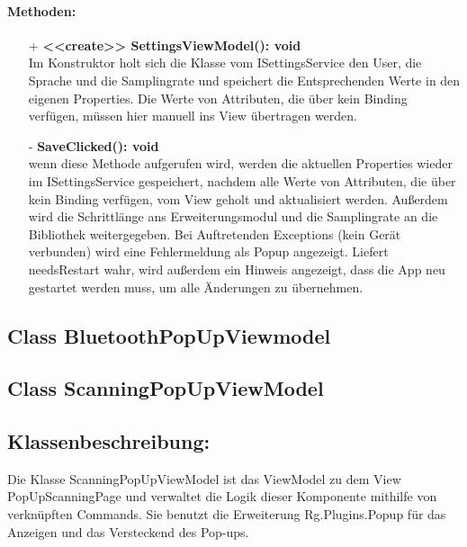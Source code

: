\documentclass[a4paper,12pt]{article}
\begin{document}
\paragraph{Methoden:}
\begin{itemize}
    \item[+] \textbf{<<create>> SettingsViewModel(): void}\\ Im Konstruktor holt sich die Klasse vom ISettingsService den User, die Sprache und die Samplingrate und speichert die Entsprechenden Werte in den eigenen Properties. Die Werte von Attributen, die über kein Binding verfügen, müssen hier manuell ins View übertragen werden.
    \item[-] \textbf{SaveClicked(): void}\\ wenn diese Methode aufgerufen wird, werden die aktuellen Properties wieder im ISettingsService gespeichert, nachdem alle Werte von Attributen, die über kein Binding verfügen, vom View geholt und aktualisiert werden. Außerdem wird die Schrittlänge ans Erweiterungsmodul und die Samplingrate an die Bibliothek weitergegeben. Bei Auftretenden Exceptions (kein Gerät verbunden) wird eine Fehlermeldung als Popup angezeigt. Liefert needsRestart wahr, wird außerdem ein Hinweis angezeigt, dass die App neu gestartet werden muss, um alle Änderungen zu übernehmen. 
\end{itemize} 

\subsection{Class BluetoothPopUpViewmodel}

\subsection{Class ScanningPopUpViewModel}
	\subsection{Klassenbeschreibung:}
	Die Klasse ScanningPopUpViewModel ist das ViewModel zu dem View PopUpScanningPage und verwaltet die Logik dieser Komponente mithilfe von verknüpften Commands.
	Sie benutzt die Erweiterung \Gls{Rg.Plugins.Popup} für das Anzeigen und das Versteckend des Pop-ups.
	
\end{document}
